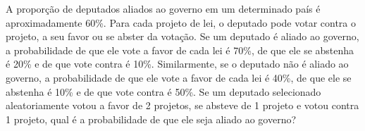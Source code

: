 \begin{exercise}
 A proporção de deputados aliados ao governo em
 um determinado país é aproximadamente 60\%.
 Para cada projeto de lei,
 o deputado pode votar contra o projeto,
 a seu favor ou se abster da votação.
 Se um deputado é aliado ao governo,
 a probabilidade de que ele vote a favor de
 cada lei é 70\%, de que ele se abstenha é 20\% e
 de que vote contra é 10\%.
 Similarmente, se o deputado não é aliado ao governo,
 a probabilidade de que ele vote
 a favor de cada lei é 40\%, de que ele se abstenha
 é 10\% e de que vote contra é 50\%.
 Se um deputado selecionado aleatoriamente
 votou a favor de 2 projetos, se absteve de 1 projeto
 e votou contra 1 projeto,
 qual é a probabilidade de que ele seja
 aliado ao governo?
\end{exercise}


